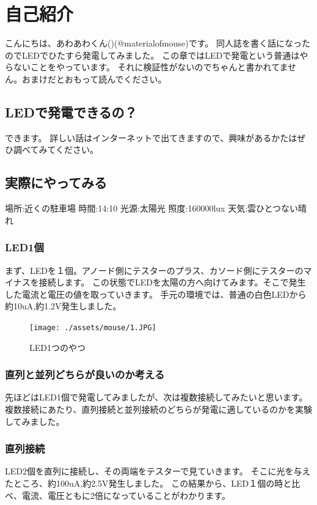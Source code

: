 \section{自己紹介}
こんにちは、あわあわくん()(@materialofmouse)です。
同人誌を書く話になったのでLEDでひたすら発電してみました。
この章ではLEDで発電という普通はやらないことをやっています。
それに検証性がないのでちゃんと書かれてません。おまけだとおもって読んでください。

\subsection{LEDで発電できるの？}
できます。
詳しい話はインターネットで出てきますので、興味があるかたはぜひ調べてみてください。

\subsection{実際にやってみる}
場所:近くの駐車場
時間:14:10
光源:太陽光
照度:160000lux
天気:雲ひとつない晴れ

\subsubsection{LED1個}
まず、LEDを１個。アノード側にテスターのプラス、カソード側にテスターのマイナスを接続します。
この状態でLEDを太陽の方へ向けてみます。そこで発生した電流と電圧の値を取っていきます。
手元の環境では、普通の白色LEDから約10uA,約1.2V発生しました。

\begin{figure}[htbp]
    \centering
    \texttt{[image: ./assets/mouse/1.JPG]}
    \caption{LED1つのやつ}
    \label{fig:led1}
\end{figure}

\subsubsection{直列と並列どちらが良いのか考える}
先ほどはLED1個で発電してみましたが、次は複数接続してみたいと思います。
複数接続にあたり、直列接続と並列接続のどちらが発電に適しているのかを実験してみました。

\subsubsection{直列接続}
LED2個を直列に接続し、その両端をテスターで見ていきます。
そこに光を与えたところ、約100uA,約2.5V発生しました。
この結果から、LED１個の時と比べ、電流、電圧ともに2倍になっていることがわかります。

